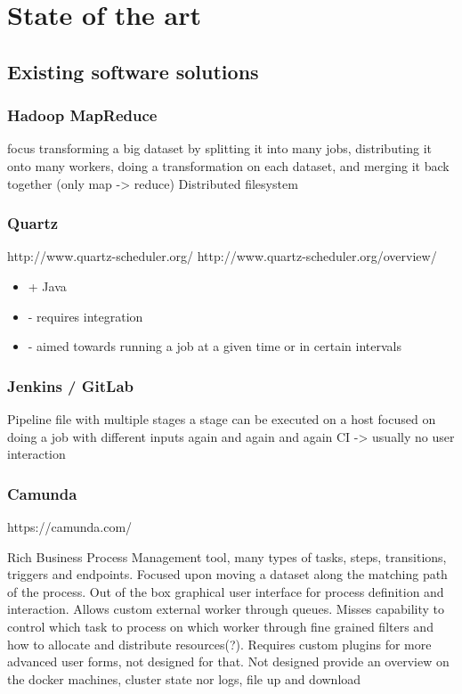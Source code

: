 \chapter{State of the art}

\section{Existing software solutions}

\subsection{Hadoop MapReduce}

focus transforming a big dataset by splitting it into many jobs, distributing it onto many workers, doing a transformation on each dataset, and merging it back together (only map -> reduce)
Distributed filesystem

\subsection{Quartz}

http://www.quartz-scheduler.org/
http://www.quartz-scheduler.org/overview/

\begin{itemize}
	\item + Java
	\item - requires integration
	\item - aimed towards running a job at a given time or in certain intervals
\end{itemize}

\subsection{Jenkins / GitLab}

Pipeline file with multiple stages
a stage can be executed on a host
focused on doing a job with different inputs again and again and again
CI -> usually no user interaction

\subsection{Camunda}

https://camunda.com/

Rich Business Process Management tool, many types of tasks, steps, transitions, triggers and endpoints.
Focused upon moving a dataset along the matching path of the process.
Out of the box graphical user interface for process definition and interaction.
Allows custom external worker through queues.
Misses capability to control which task to process on which worker through fine grained filters and how to allocate and distribute resources(?).
Requires custom plugins for more advanced user forms, not designed for that.
Not designed provide an overview on the docker machines, cluster state nor logs, file up and download

